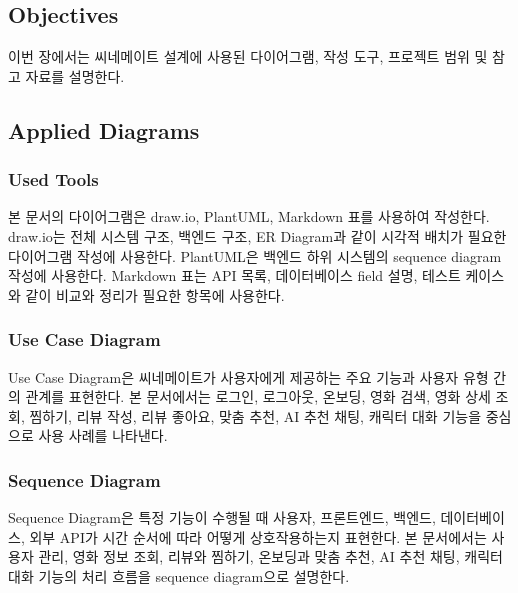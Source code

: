 \documentclass[11pt,a4paper]{article}
\begin{document}
\hypertarget{objectives}{%
\subsection{Objectives}\label{objectives}}

이번 장에서는 씨네메이트 설계에 사용된 다이어그램, 작성 도구, 프로젝트 범위 및 참고 자료를 설명한다.

\hypertarget{applied-diagrams}{%
\subsection{Applied Diagrams}\label{applied-diagrams}}

\hypertarget{used-tools}{%
\subsubsection{Used Tools}\label{used-tools}}

본 문서의 다이어그램은 draw.io, PlantUML, Markdown 표를 사용하여 작성한다. draw.io는 전체 시스템 구조, 백엔드 구조, ER Diagram과 같이 시각적 배치가 필요한 다이어그램 작성에 사용한다. PlantUML은 백엔드 하위 시스템의 sequence diagram 작성에 사용한다. Markdown 표는 API 목록, 데이터베이스 field 설명, 테스트 케이스와 같이 비교와 정리가 필요한 항목에 사용한다.

\hypertarget{use-case-diagram}{%
\subsubsection{Use Case Diagram}\label{use-case-diagram}}

Use Case Diagram은 씨네메이트가 사용자에게 제공하는 주요 기능과 사용자 유형 간의 관계를 표현한다. 본 문서에서는 로그인, 로그아웃, 온보딩, 영화 검색, 영화 상세 조회, 찜하기, 리뷰 작성, 리뷰 좋아요, 맞춤 추천, AI 추천 채팅, 캐릭터 대화 기능을 중심으로 사용 사례를 나타낸다.

\hypertarget{sequence-diagram}{%
\subsubsection{Sequence Diagram}\label{sequence-diagram}}

Sequence Diagram은 특정 기능이 수행될 때 사용자, 프론트엔드, 백엔드, 데이터베이스, 외부 API가 시간 순서에 따라 어떻게 상호작용하는지 표현한다. 본 문서에서는 사용자 관리, 영화 정보 조회, 리뷰와 찜하기, 온보딩과 맞춤 추천, AI 추천 채팅, 캐릭터 대화 기능의 처리 흐름을 sequence diagram으로 설명한다.
\end{document}

